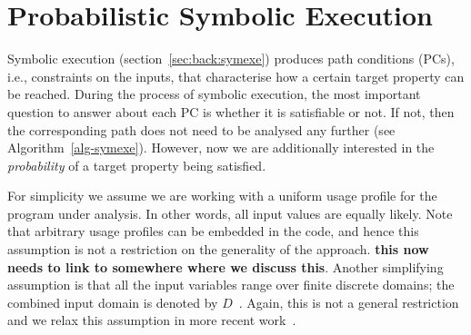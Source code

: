 \section{Probabilistic Symbolic Execution}
\label{sec:pse}

Symbolic execution (section~\ref{sec:back:symexe}) produces path conditions (PCs), i.e., constraints on the inputs, that characterise how a certain target property can be reached. During the process of symbolic execution, the most important question to answer about each PC is whether it is satisfiable or not.  If not, then the corresponding path does not need to be analysed any further (see Algorithm~\ref{alg-symexe}).  However, now we are additionally interested in the \emph{probability} of a target property being satisfied. 

For simplicity we assume we are working with a uniform usage profile for the program under analysis.  In other words, all input values are equally likely.  Note that arbitrary usage profiles can be embedded in the code, and hence this assumption is not a restriction on the generality of the approach. {\bf this now needs to link to somewhere where we discuss this}. Another simplifying assumption is that all the input variables range over finite discrete domains; the combined input domain is denoted by $D$~\cite{filieri2013reliability}. Again, this is not a general restriction and we relax this assumption in more recent work~\cite{borges2014compositional}.


